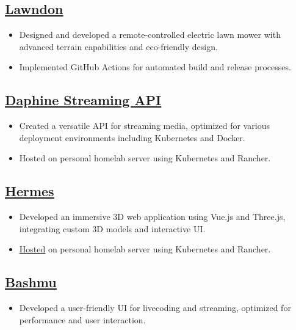 \documentclass[a4paper,10pt]{article}
\begin{document}
\subsection*{\href{https://github.com/jordojordo/lawndon-lite}{\underline{Lawndon}}}
\begin{itemize}[leftmargin=1.5em]
    \item Designed and developed a remote-controlled electric lawn mower with advanced terrain capabilities and eco-friendly design.
    \item Implemented GitHub Actions for automated build and release processes.
\end{itemize}

\subsection*{\href{https://github.com/jordojordo/daphine}{\underline{Daphine Streaming API}}}
\begin{itemize}[leftmargin=1.5em]
    \item Created a versatile API for streaming media, optimized for various deployment environments including Kubernetes and Docker.
    \item Hosted on personal homelab server using Kubernetes and Rancher.
\end{itemize}

\subsection*{\href{https://github.com/jordojordo/hermes}{\underline{Hermes}}}
\begin{itemize}[leftmargin=1.5em]
    \item Developed an immersive 3D web application using Vue.js and Three.js, integrating custom 3D models and interactive UI.
    \item \href{https://hermes.yokanga.xyz}{\underline{Hosted}} on personal homelab server using Kubernetes and Rancher.
\end{itemize}

\subsection*{\href{https://github.com/jordojordo/bashmu}{\underline{Bashmu}}}
\begin{itemize}[leftmargin=1.5em]
    \item Developed a user-friendly UI for livecoding and streaming, optimized for performance and user interaction.
\end{itemize}
\end{document}
